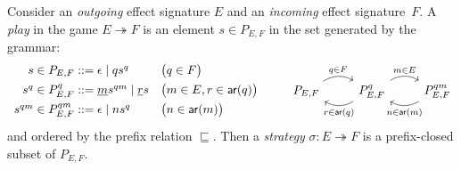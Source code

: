 \documentclass[acmsmall,screen,review,anonymous,nonacm]{acmart}
\newcommand{\kw}[1]{\ensuremath{ \mathsf{#1} }}
\begin{document}
\begin{definition}[Strategy] \label{def:strat} %
Consider an \emph{outgoing} effect signature $E$
and an \emph{incoming} effect signature~$F$.
A \emph{play} in the game $E \twoheadrightarrow F$
is an element $s \in P_{E,F}$
in the set generated by the grammar:
\[
  \begin{array}{r@{}ll}
    s \in P_{E,F} &{} ::= \epsilon \mid q s^q &
    \bigl( q \in F \bigr)
  \\[1ex]
    s^q \in P_{E,F}^q &{} ::= \underline{m} s^{qm} \mid \underline{r} s &
    \bigl( m \in E, r \in \kw{ar}(q) \bigr)
  \\[1ex]
    s^{qm} \in P_{E,F}^{qm} &{} ::= \epsilon \mid n s^q &
    \bigl( n \in \kw{ar}(m) \bigr)
  \end{array}
  \qquad
  \begin{tikzcd}
    P_{E,F} \ar[r, bend left, "q \in F"] &
    P_{E,F}^q \ar[r, bend left, "m \in E"] \ar[l, bend left, "r \in \kw{ar}(q)"] &
    P_{E,F}^{qm} \ar[l, bend left, "n \in \kw{ar}(m)"]
  \end{tikzcd}
\]
and ordered by the prefix relation $\sqsubseteq$.
Then a \emph{strategy} $\sigma : E \twoheadrightarrow F$
is a prefix-closed subset of $P_{E,F}$.
\end{definition}
\end{document}
